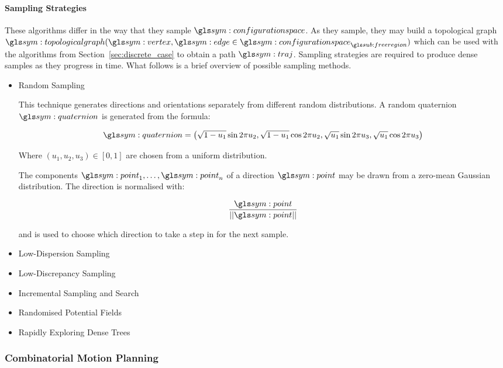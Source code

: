 			\paragraph{Sampling Strategies}%
			\label{sec:sampling_strategies}

				These algorithms differ in the way that they sample
				$\configurationspace$. As they sample, they may build a
				topological graph \( \topologicalgraph(\vertex, \edge \in
				\configurationspace_{\freeregion}) \) which can be used with the
				algorithms from Section~\ref{sec:discrete_case} to obtain a path
				$\pathsym$.  Sampling strategies are required to produce dense
				samples as they progress in time.  What follows is a brief
				overview of possible sampling methods.

				\begin{itemize}

					\item Random Sampling

						This technique generates directions and orientations
						separately from different random distributions.  A
						random quaternion $\quaternion$ is generated from the
						formula:

						\begin{equation}
							\quaternion =
								\left(
									\sqrt
									{%
										1 - u_1
									}
									\sin
										2\pi u_2
									,
									\sqrt
									{%
										1 - u_1
									}
									\cos
										2\pi u_2
									,
									\sqrt
									{%
										u_1
									}
									\sin
										2\pi u_3
									,
									\sqrt
									{%
										u_1
									}
									\cos
										2\pi u_3
								\right)
						\end{equation}

						Where
						\(
							(u_1, u_2, u_3) \in [0, 1]
						\)
						are chosen from a uniform distribution.

						The components
						\(
							\point_1, \ldots, \point_n
						\)
						of a direction $\point$ may be drawn from a zero-mean
						Gaussian distribution. The direction is normalised with:

						\begin{equation}
							\frac{\point}{\norm{\point}}
						\end{equation}

						and is used to choose which direction to take a step in
						for the next sample.

					\item Low-Dispersion Sampling

					\item Low-Discrepancy Sampling

					\item Incremental Sampling and Search

					\item Randomised Potential Fields

					\item Rapidly Exploring Dense Trees
				\end{itemize}

		\subsubsection{Combinatorial Motion Planning}%
		\label{sec:combinatorial_motion_planning}
